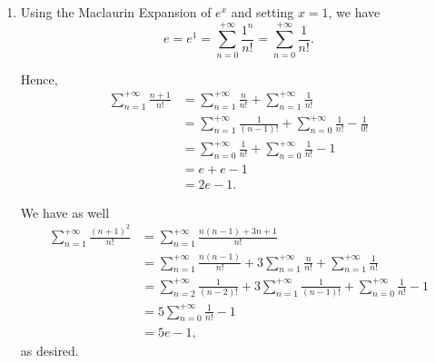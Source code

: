 \Question{\currfilebase}

\begin{enumerate}
    \item Using the Maclaurin Expansion of \(e^x\) and setting \(x = 1\), we have
          \[
              e = e^1 = \sum_{n = 0}^{+\infty} \frac{1^n}{n!} = \sum_{n = 0}^{+\infty} \frac{1}{n!}.
          \]

          Hence,
          \begin{align*}
              \sum_{n = 1}^{+\infty} \frac{n + 1}{n!} & = \sum_{n = 1}^{+\infty} \frac{n}{n!} + \sum_{n = 1}^{+\infty} \frac{1}{n!}                      \\
                                                      & = \sum_{n = 1}^{+\infty} \frac{1}{(n - 1)!} + \sum_{n = 0}^{+\infty} \frac{1}{n!} - \frac{1}{0!} \\
                                                      & = \sum_{n = 0}^{+\infty} \frac{1}{n!} + \sum_{n = 0}^{+\infty} \frac{1}{n!} - 1                  \\
                                                      & = e + e - 1                                                                                      \\
                                                      & = 2e-1.
          \end{align*}

          We have as well
          \begin{align*}
              \sum_{n = 1}^{+\infty} \frac{(n + 1)^2}{n!} & = \sum_{n = 1}^{+\infty} \frac{n (n - 1) + 3n + 1}{n!}                                                                              \\
                                                          & = \sum_{n = 1}^{+\infty} \frac{n(n - 1)}{n!} + 3 \sum_{n = 1}^{+\infty} \frac{n}{n!} + \sum_{n = 1}^{+\infty} \frac{1}{n!}          \\
                                                          & = \sum_{n = 2}^{+\infty} \frac{1}{(n - 2)!} + 3 \sum_{n = 1}^{+\infty} \frac{1}{(n - 1)!} + \sum_{n = 0}^{+\infty} \frac{1}{n!} - 1 \\
                                                          & = 5\sum_{n = 0}^{+\infty} \frac{1}{n!} - 1                                                                                          \\
                                                          & = 5e - 1,
          \end{align*}
          as desired.


\end{enumerate}
